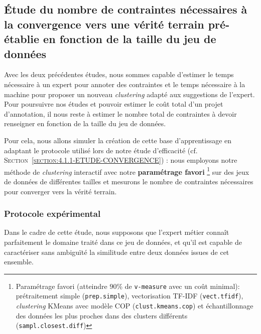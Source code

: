 	\subsection{Étude du nombre de contraintes nécessaires à la convergence vers une vérité terrain pré-établie en fonction de la taille du jeu de données}
	\label{section:4.3.3-ETUDE-COUT-NOMBRE-CONTRAINTES}
			
		Avec les deux précédentes études, nous sommes capable d'estimer le temps nécessaire à un expert pour annoter des contraintes et le temps nécessaire à la machine pour proposer un nouveau \textit{clustering} adapté aux suggestions de l'expert.
		Pour poursuivre nos études et pouvoir estimer le coût total d'un projet d'annotation, il nous reste à estimer le nombre total de contraintes à devoir renseigner en fonction de la taille du jeu de données.
		
		Pour cela, nous allons simuler la création de cette base d'apprentissage en adaptant le protocole utilisé lors de notre étude d'efficacité (cf. \textsc{Section~\ref{section:4.1.1-ETUDE-CONVERGENCE}}) :
		nous employons notre méthode de \textit{clustering} interactif avec notre \textbf{paramétrage favori}
		\footnote{Paramétrage favori (atteindre $90$\% de \texttt{v-measure} avec un coût minimal): prétraitement simple (\texttt{prep.simple}), vectorisation TF-IDF (\texttt{vect.tfidf}), \textit{clustering} KMeans avec modèle COP (\texttt{clust.kmeans.cop}) et échantillonnage des données les plus proches dans des clusters différents (\texttt{sampl.closest.diff})}
		sur des jeux de données de différentes tailles et mesurons le nombre de contraintes nécessaires pour converger vers la vérité terrain.
	
		\subsubsection{Protocole expérimental}
			
			\begin{leftBarWarning}
				Dans le cadre de cette étude, nous supposons que l'expert métier connaît parfaitement le domaine traité dans ce jeu de données, et qu'il est capable de caractériser sans ambiguïté la similitude entre deux données issues de cet ensemble.
			\end{leftBarWarning}
			
